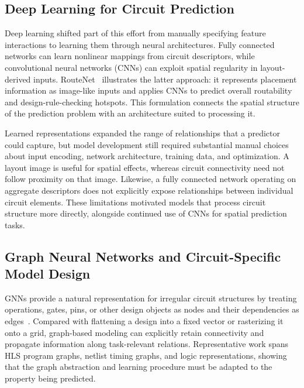 \subsection{Deep Learning for Circuit Prediction}
\label{sec:deep_circuit_modeling}

Deep learning shifted part of this effort from manually specifying feature interactions to learning them through neural architectures. Fully connected networks can learn nonlinear mappings from circuit descriptors, while convolutional neural networks (CNNs) can exploit spatial regularity in layout-derived inputs. RouteNet~\cite{xie2018routenet} illustrates the latter approach: it represents placement information as image-like inputs and applies CNNs to predict overall routability and design-rule-checking hotspots. This formulation connects the spatial structure of the prediction problem with an architecture suited to processing it.

Learned representations expanded the range of relationships that a predictor could capture, but model development still required substantial manual choices about input encoding, network architecture, training data, and optimization. A layout image is useful for spatial effects, whereas circuit connectivity need not follow proximity on that image. Likewise, a fully connected network operating on aggregate descriptors does not explicitly expose relationships between individual circuit elements. These limitations motivated models that process circuit structure more directly, alongside continued use of CNNs for spatial prediction tasks.

\subsection{Graph Neural Networks and Circuit-Specific Model Design}
\label{sec:semantic_codesign}

GNNs provide a natural representation for irregular circuit structures by treating operations, gates, pins, or other design objects as nodes and their dependencies as edges~\cite{lopera2021survey}. Compared with flattening a design into a fixed vector or rasterizing it onto a grid, graph-based modeling can explicitly retain connectivity and propagate information along task-relevant relations. Representative work spans HLS program graphs, netlist timing graphs, and logic representations, showing that the graph abstraction and learning procedure must be adapted to the property being predicted.

